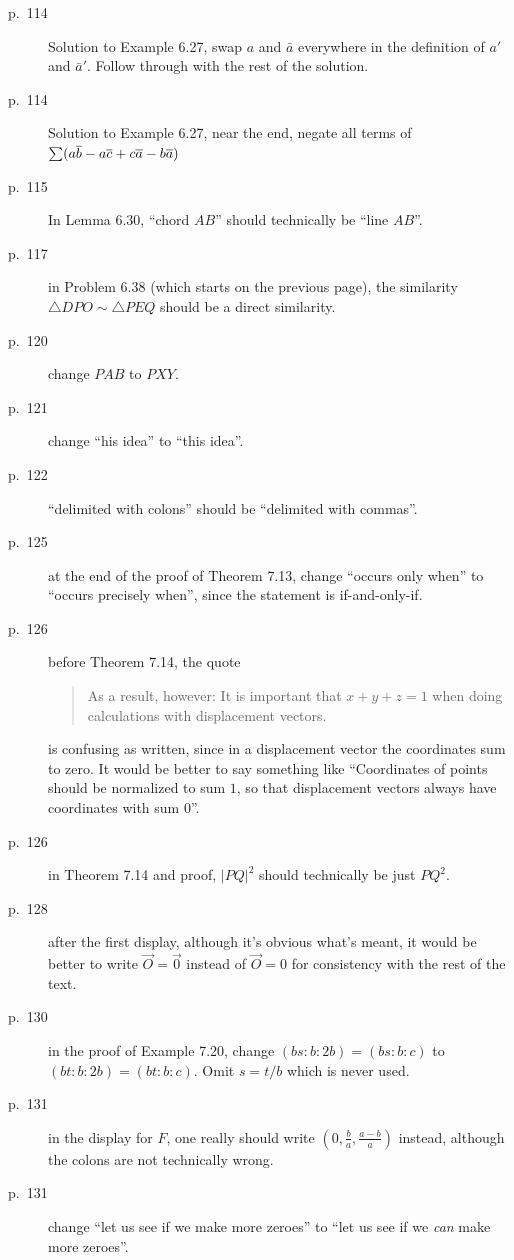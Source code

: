 \documentclass[11pt]{scrartcl}
\begin{document}
\begin{description}
\item[p.\  114] Solution to Example 6.27, swap $a$ and $\bar a$ everywhere
  in the definition of $a'$ and $\bar a'$.
  Follow through with the rest of the solution.
\item[p.\  114] Solution to Example 6.27, near the end, negate all terms of
  $\sum (a \overline b - a \overline c + c \overline a - b \overline a)$
\item[p.\  115] In Lemma 6.30, ``chord $AB$'' should technically be ``line $AB$''.
\item[p.\  117] in Problem 6.38 (which starts on the previous page), the similarity
  $\triangle DPO \sim \triangle PEQ$ should be a direct similarity.
\item[p.\  120] change $PAB$ to $PXY$.
\item[p.\  121] change ``his idea'' to ``this idea''.
\item[p.\  122] ``delimited with colons'' should be ``delimited with commas''.
\item[p.\  125] at the end of the proof of Theorem 7.13,
  change ``occurs only when'' to ``occurs precisely when'',
  since the statement is if-and-only-if.
\item[p.\  126] before Theorem 7.14, the quote
  \begin{quote}
    As a result, however:
    It is important that $x+y+z=1$ when doing calculations with displacement vectors.
  \end{quote}
  is confusing as written, since in a displacement vector the coordinates sum to zero.
  It would be better to say something like
  ``Coordinates of points should be normalized to sum $1$,
  so that displacement vectors always have coordinates with sum $0$''.
\item[p.\  126] in Theorem 7.14 and proof, $|PQ|^2$ should technically be just $PQ^2$.
\item[p.\  128] after the first display,
  although it's obvious what's meant, it would be better to write $\vec O = \vec 0$
  instead of $\vec O = 0$ for consistency with the rest of the text.
\item[p.\  130] in the proof of Example 7.20, change $(bs:b:2b)=(bs:b:c)$ to $(bt:b:2b)=(bt:b:c)$.
  Omit $s=t/b$ which is never used.
\item[p.\  131] in the display for $F$, one really should write $(0, \frac ba, \frac{a-b}{a})$ instead,
  although the colons are not technically wrong.
\item[p.\  131] change ``let us see if we make more zeroes''
  to ``let us see if we \emph{can} make more zeroes''.

\end{description}
\end{document}
